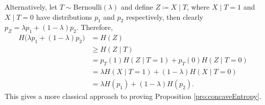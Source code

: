 \documentclass[math]{amznotes}
\theoremstyle{remark}
\begin{document}
Alternatively, let $T \sim \mathrm{Bernoulli}\left(\lambda\right)$ and define $Z \coloneqq X \mid T$, where $X \mid T = 1$ and $X \mid T = 0$ have distributions $p_1$ and $p_2$ respectively, then clearly $p_Z = \lambda p_1 + \left(1 - \lambda\right)p_2$. Therefore,
\begin{align*}
    H\bigl(\lambda p_1 + \left(1 - \lambda\right)p_2\bigr) & = H\left(Z\right) \\
    & \geq H\left(Z \mid T\right) \\
    & = p_T\left(1\right)H\left(Z \mid T = 1\right) + p_T\left(0\right)H\left(Z \mid T = 0\right) \\
    & = \lambda H\left(X \mid T = 1\right) + \left(1 - \lambda\right)H\left(X \mid T = 0\right) \\
    & = \lambda H\left(p_1\right) + \left(1 - \lambda\right)H\left(p_2\right).
\end{align*}
This gives a more classical approach to proving Proposition \ref{pro:concaveEntropy}.
\end{document}
